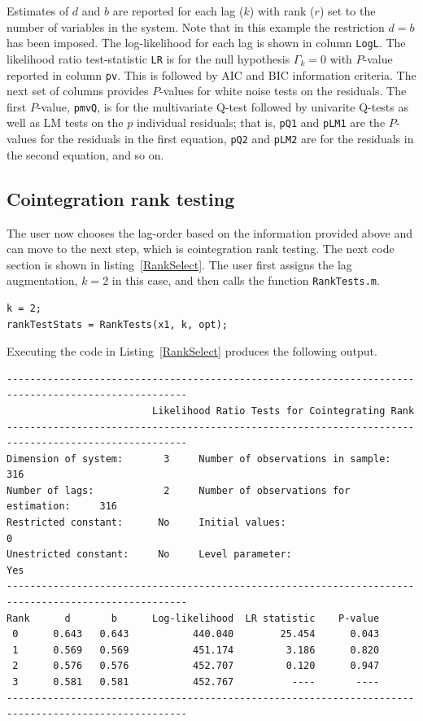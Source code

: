 \documentclass[10pt]{article}
\begin{document}
Estimates of $d$ and $b$ are reported for each lag ($k$) with rank ($r$) set to the number of variables in the system. Note that in this example the restriction $d=b$ has been imposed. The log-likelihood for each lag is shown in column \verb|LogL|. The likelihood ratio test-statistic \verb|LR| is for the null hypothesis $\Gamma_k = 0$ with $P$-value reported in column \verb|pv|. This is followed by AIC and BIC information criteria. The next set of columns provides $P$-values for white noise tests on the residuals. The first $P$-value, \verb|pmvQ|, is for the multivariate Q-test followed by univarite Q-tests as well as LM tests on the $p$ individual residuals; that is, \verb|pQ1| and \verb|pLM1| are the $P$-values for the residuals in the first equation, \verb|pQ2| and \verb|pLM2| are for the residuals in the second equation, and so on. 


\subsection{Cointegration rank testing}

The user now chooses the lag-order based on the information provided above and can move to the next step, which is cointegration rank testing. The next code section is shown in listing~\ref{RankSelect}. The user first assigns the lag augmentation, $k=2$ in this case, and then calls the function \verb|RankTests.m|. 

\begin{lstlisting}[frame=single,caption={Cointegration rank testing}, label = RankSelect]
%% --------- COINTEGRATION RANK TESTING ---------- %
k = 2;
rankTestStats = RankTests(x1, k, opt);
\end{lstlisting}

Executing the code in Listing~\ref{RankSelect} produces the following output. 

\begin{verbatim}
-----------------------------------------------------------------------------------------------------
                         Likelihood Ratio Tests for Cointegrating Rank                               
-----------------------------------------------------------------------------------------------------
Dimension of system:       3     Number of observations in sample:          316 
Number of lags:            2     Number of observations for estimation:     316 
Restricted constant:      No     Initial values:                              0
Unestricted constant:     No     Level parameter:                           Yes
-----------------------------------------------------------------------------------------------------
Rank 	  d  	  b  	 Log-likelihood	 LR statistic	 P-value
 0   	0.643	0.643	        440.040	       25.454	   0.043
 1   	0.569	0.569	        451.174	        3.186	   0.820
 2   	0.576	0.576	        452.707	        0.120	   0.947
 3   	0.581	0.581	        452.767	         ----	    ----
-----------------------------------------------------------------------------------------------------
\end{verbatim}
\end{document}
